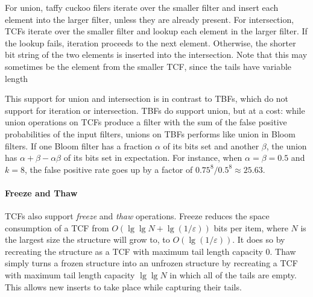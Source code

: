 \documentclass[sigconf, nonacm]{acmart}
\begin{document}
For union, taffy cuckoo filers iterate over the smaller filter and insert each element into the larger filter, unless they are already present.
For intersection, TCFs iterate over the smaller filter and lookup each element in the larger filter.
If the lookup fails, iteration proceeds to the next element.
Otherwise, the shorter bit string of the two elements is inserted into the intersection.
Note that this may sometimes be the element from the smaller TCF, since the tails have variable length


This support for union and intersection is in contrast to TBFs, which do not support for iteration or intersection.
TBFs do support union, but at a cost: while union operations on TCFs produce a filter with the sum of the false positive probabilities of the input filters, unions on TBFs performs like union in Bloom filters.
If one Bloom filter has a fraction $\alpha$ of its bits set and another $\beta$, the union has $\alpha + \beta - \alpha \beta$ of its bits set in expectation.
For instance, when $\alpha = \beta = 0.5$ and $k = 8$, the false positive rate goes up by a factor of $0.75^8/0.5^8 \approx 25.63$. %

\paragraph{Freeze and Thaw}
TCFs also support {\em freeze} and {\em thaw} operations.
Freeze reduces the space consumption of a TCF from $O(\lg \lg N + \lg (1/\varepsilon))$ bits per item, where $N$ is the largest size the structure will grow to, to $O(\lg (1/\varepsilon))$.
It does so by recreating the structure as a TCF with maximum tail length capacity $0$.
Thaw simply turns a frozen structure into an unfrozen structure by recreating a TCF with maximum tail length capacity $\lg \lg N$ in which all of the tails are empty.
This allows new inserts to take place while capturing their tails.
\end{document}
